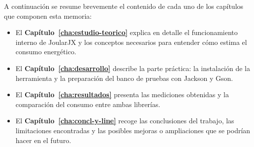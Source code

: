 A continuación se resume brevemente el contenido de cada uno de los capítulos que componen esta memoria:

\begin{itemize}
	\item El \textbf{Capítulo~\ref{cha:estudio-teorico}} explica en detalle el
	funcionamiento interno de JoularJX y los conceptos necesarios para
	entender cómo estima el consumo energético.
	\item El \textbf{Capítulo~\ref{cha:desarrollo}} describe la parte práctica:
	la instalación de la herramienta y la preparación del banco de pruebas con
	Jackson y Gson.
	\item El \textbf{Capítulo~\ref{cha:resultados}} presenta las mediciones
	obtenidas y la comparación del consumo entre ambas librerías.
	\item El \textbf{Capítulo~\ref{cha:concl-y-line}} recoge las conclusiones
	del trabajo, las limitaciones encontradas y las posibles mejoras o
	ampliaciones que se podrían hacer en el futuro.
\end{itemize}

